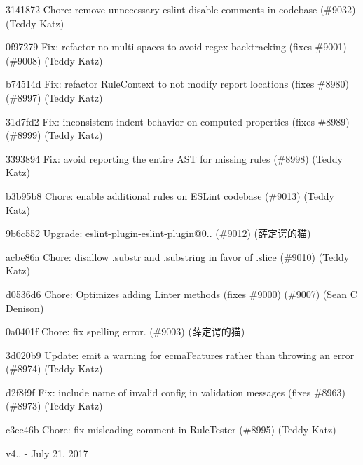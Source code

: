 \begin{DoxyItemize}
\item 3141872 Chore\+: remove unnecessary eslint-\/disable comments in codebase (\#9032) (Teddy Katz)
\item 0f97279 Fix\+: refactor no-\/multi-\/spaces to avoid regex backtracking (fixes \#9001) (\#9008) (Teddy Katz)
\item b74514d Fix\+: refactor Rule\+Context to not modify report locations (fixes \#8980) (\#8997) (Teddy Katz)
\item 31d7fd2 Fix\+: inconsistent {\ttfamily indent} behavior on computed properties (fixes \#8989) (\#8999) (Teddy Katz)
\item 3393894 Fix\+: avoid reporting the entire AST for missing rules (\#8998) (Teddy Katz)
\item b3b95b8 Chore\+: enable additional rules on ESLint codebase (\#9013) (Teddy Katz)
\item 9b6c552 Upgrade\+: eslint-\/plugin-\/eslint-\/plugin@0.. (\#9012) (薛定谔的猫)
\item acbe86a Chore\+: disallow .substr and .substring in favor of .slice (\#9010) (Teddy Katz)
\item d0536d6 Chore\+: Optimizes adding Linter methods (fixes \#9000) (\#9007) (Sean C Denison)
\item 0a0401f Chore\+: fix spelling error. (\#9003) (薛定谔的猫)
\item 3d020b9 Update\+: emit a warning for ecma\+Features rather than throwing an error (\#8974) (Teddy Katz)
\item d2f8f9f Fix\+: include name of invalid config in validation messages (fixes \#8963) (\#8973) (Teddy Katz)
\item c3ee46b Chore\+: fix misleading comment in Rule\+Tester (\#8995) (Teddy Katz)
\end{DoxyItemize}

v4.. -\/ July 21, 2017


